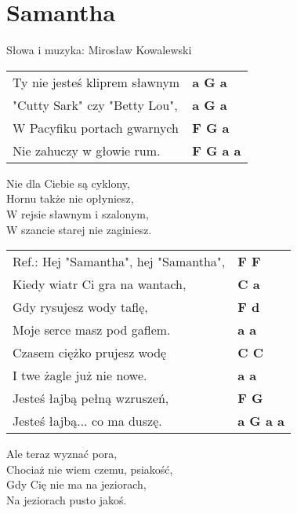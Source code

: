 \section{Samantha}

Słowa i muzyka: Mirosław Kowalewski \\

\vspace{2em}
\begin{tabular}{@{}p{9cm}@{}l@{}}
Ty nie jesteś kliprem sławnym & \bfseries  a G a \\
"Cutty Sark" czy "Betty Lou", & \bfseries  a G a \\
W Pacyfiku portach gwarnych & \bfseries  F G a \\
Nie zahuczy w głowie rum. & \bfseries  F G a a \\
\end{tabular}

\vspace{1em}
Nie dla Ciebie są cyklony, \\
Hornu także nie opłyniesz, \\
W rejsie sławnym i szalonym, \\
W szancie starej nie zaginiesz. \\

\vspace{1em}
\begin{tabular}{@{}p{9cm}@{}l@{}}
Ref.: Hej "Samantha", hej "Samantha", & \bfseries  F F \\
Kiedy wiatr Ci gra na wantach, & \bfseries  C a \\
Gdy rysujesz wody taflę, & \bfseries  F d \\
Moje serce masz pod gaflem. & \bfseries  a a \\
Czasem ciężko prujesz wodę & \bfseries  C C \\
I twe żagle już nie nowe. & \bfseries  a a \\
Jesteś łajbą pełną wzruszeń, & \bfseries F G \\
Jesteś łajbą... co ma duszę. & \bfseries  a G a a \\
\end{tabular}

\vspace{1em}
Ale teraz wyznać pora, \\
Chociaż nie wiem czemu, psiakość, \\
Gdy Cię nie ma na jeziorach, \\
Na jeziorach pusto jakoś. \\

